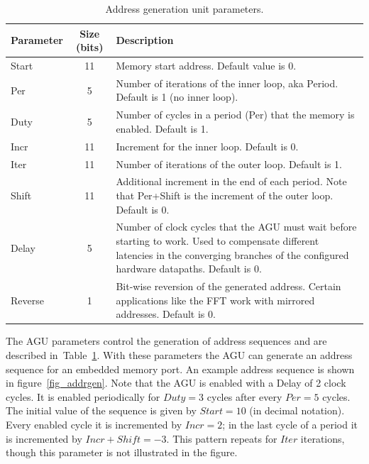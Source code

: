 \begin{table}[!htb]
  \renewcommand{\arraystretch}{1.2} %
  \caption{Address generation unit parameters.}
  \label{tab:MemParameter}
  \centering
  \begin{tabular}{lcp{10cm}}
    \toprule
    Parameter & Size (bits) & Description\\
    \midrule
    Start     &          11 & Memory start address. Default value is 0. \\
    Per       &           5 & Number of iterations of the inner loop, aka Period. Default is 1 (no inner loop). \\
    Duty      &           5 & Number of cycles in a period (Per) that the memory is enabled. Default is 1.\\
    Incr      &          11 & Increment for the inner loop. Default is 0.\\
    Iter      &          11 & Number of iterations of the outer loop. Default is 1.\\
    Shift     &          11 & Additional increment in the end of each period. Note that Per+Shift is the increment of the outer loop. Default is 0.\\
    Delay     &           5 & Number of clock cycles that the AGU must wait before starting to work. Used to compensate different latencies in the converging branches of the configured hardware datapaths. Default is 0.\\
    Reverse   &           1 & Bit-wise reversion of the generated address. Certain applications like the FFT work with mirrored addresses. Default is 0.\\
    \bottomrule
  \end{tabular}
\end{table}

The AGU parameters control the generation of address sequences and are
described in~Table~\ref{tab:MemParameter}. With these parameters the
AGU can generate an address sequence for an embedded memory port. An
example address sequence is shown in figure~\ref{fig_addrgen}. Note
that the AGU is enabled with a Delay of 2 clock cycles. It is enabled
periodically for $Duty=3$ cycles after every $Per=5$ cycles. The
initial value of the sequence is given by $Start=10$ (in decimal
notation). Every enabled cycle it is incremented by $Incr=2$; in the
last cycle of a period it is incremented by $Incr+Shift=-3$. This
pattern repeats for $Iter$ iterations, though this parameter is not
illustrated in the figure.

